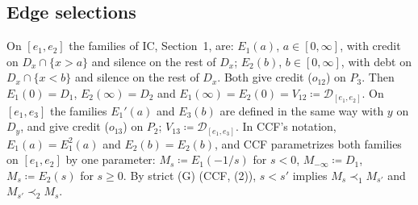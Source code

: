 \documentclass[11pt]{article}
\theoremstyle{definition}\newtheorem{definition}[theorem]{Definition}
\theoremstyle{remark}\newtheorem{remark}[theorem]{Remark}
\newcommand{\Dscr}{\mathcal D}
\begin{document}
\subsection{Edge selections}

On $[e_1,e_2]$ the families of IC, Section~1, are: $E_1(a)$, $a\in[0,\infty]$,
with credit on $D_x\cap\{x>a\}$ and silence on the rest of $D_x$; $E_2(b)$,
$b\in[0,\infty]$, with debt on $D_x\cap\{x<b\}$ and silence on the rest of
$D_x$. Both give credit ($o_{12}$) on $P_3$. Then $E_1(0)=D_1$,
$E_2(\infty)=D_2$ and $E_1(\infty)=E_2(0)=V_{12}\coloneqq\Dscr_{[e_1,e_2]}$.
On $[e_1,e_3]$ the families $E_1'(a)$ and $E_3(b)$ are defined in the same
way with $y$ on $D_y$, and give credit ($o_{13}$) on $P_2$;
$V_{13}\coloneqq\Dscr_{[e_1,e_3]}$. In CCF's notation, $E_1(a)=E^2_1(a)$ and
$E_2(b)=E_2(b)$, and CCF parametrizes both families on $[e_1,e_2]$ by one
parameter: $M_s\coloneqq E_1(-1/s)$ for $s<0$, $M_{-\infty}\coloneqq D_1$,
$M_s\coloneqq E_2(s)$ for $s\ge0$. By strict (G) (CCF, (2)), $s<s'$ implies
$M_s\prec_1M_{s'}$ and $M_{s'}\prec_2M_s$.
\end{document}
